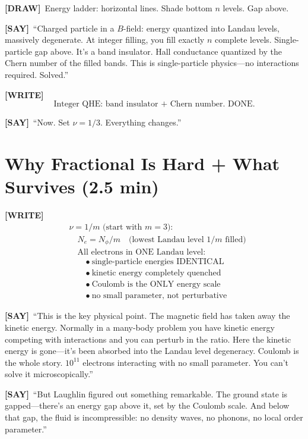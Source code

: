 \documentclass[11pt]{article}
\newcommand{\WRITE}{\textcolor{writecol}{\textbf{[WRITE]}}}
\newcommand{\SAY}{\textcolor{saycol}{\textbf{[SAY]}}}
\newcommand{\DRAW}{\textcolor{drawcol}{\textbf{[DRAW]}}}
\begin{document}
\DRAW\ Energy ladder: horizontal lines. Shade bottom $n$ levels. Gap above.

\SAY\ ``Charged particle in a $B$-field: energy quantized into Landau levels, massively degenerate. At integer filling, you fill exactly $n$ complete levels. Single-particle gap above. It's a band insulator. Hall conductance quantized by the Chern number of the filled bands. This is single-particle physics---no interactions required. Solved.''

\WRITE
\begin{equation*}
\text{Integer QHE: band insulator + Chern number. DONE.}
\end{equation*}

\SAY\ ``Now. Set $\nu = 1/3$. Everything changes.''

\section{Why Fractional Is Hard + What Survives (2.5 min)}

\WRITE
\begin{align*}
&\nu = 1/m \text{ (start with }m=3\text{):}\\[4pt]
&\quad N_e = N_\phi / m \quad\text{(lowest Landau level $1/m$ filled)}\\[6pt]
&\quad\text{All electrons in ONE Landau level:}\\
&\qquad\bullet\ \text{single-particle energies IDENTICAL}\\
&\qquad\bullet\ \text{kinetic energy completely quenched}\\
&\qquad\bullet\ \text{Coulomb is the ONLY energy scale}\\
&\qquad\bullet\ \text{no small parameter, not perturbative}
\end{align*}

\SAY\ ``This is the key physical point. The magnetic field has taken away the kinetic energy. Normally in a many-body problem you have kinetic energy competing with interactions and you can perturb in the ratio. Here the kinetic energy is gone---it's been absorbed into the Landau level degeneracy. Coulomb is the whole story. $10^{11}$ electrons interacting with no small parameter. You can't solve it microscopically.''

\SAY\ ``But Laughlin figured out something remarkable. The ground state is gapped---there's an energy gap above it, set by the Coulomb scale. And below that gap, the fluid is incompressible: no density waves, no phonons, no local order parameter.''
\end{document}
